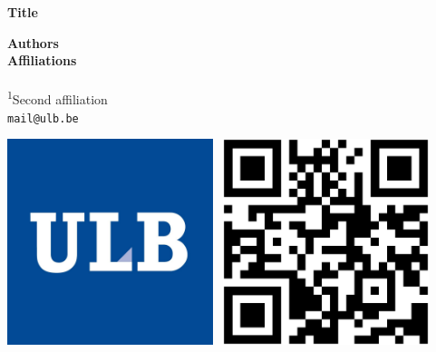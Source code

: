 \documentclass[a0,portrait]{a0poster}
\begin{document}


\VeryHuge \color{black} \begin{center}
\textbf{Title} %
\end{center}
\vspace{0cm} %

\begin{minipage}[b]{0.6\linewidth}
\Large \textbf{Authors \\
Affiliations \\}\\
\textsuperscript{1}Second affiliation  \\[0.5cm] %
\Large \texttt{mail@ulb.be}
\end{minipage}
%
\begin{minipage}[b]{0.4\linewidth}
\hspace*{2cm}
\includegraphics[height=6cm]{logos/logo_ulb.png}\
\hspace*{3cm}
\includegraphics[height=6cm]{logos/qr-code.eps}\\[1cm]
\hspace*{2cm}
\end{minipage}
\end{document}
